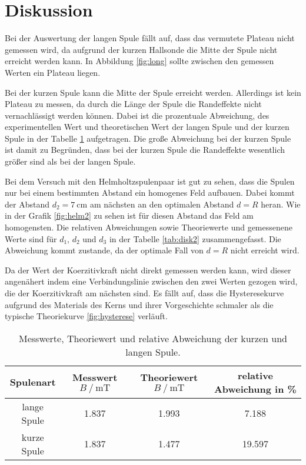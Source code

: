 \section{Diskussion}
\label{sec:Diskussion}

Bei der Auswertung der langen Spule fällt auf, dass das vermutete Plateau nicht gemessen wird, da aufgrund der kurzen Hallsonde die Mitte der Spule nicht erreicht werden kann.
In Abbildung \ref{fig:long} sollte zwischen den gemessen Werten ein Plateau liegen.

Bei der kurzen Spule kann die Mitte der Spule erreicht werden. 
Allerdings ist kein Plateau zu messen, da durch die Länge der Spule die Randeffekte nicht vernachlässigt werden können.
Dabei ist die prozentuale Abweichung, des experimentellen Wert und theoretischen Wert der langen Spule und der kurzen Spule in der Tabelle \ref{tab:disk1} aufgetragen.
Die große Abweichung bei der kurzen Spule ist damit zu Begründen, dass bei der kurzen Spule die Randeffekte wesentlich größer sind als bei der langen Spule.

Bei dem Versuch mit den Helmholtzspulenpaar ist gut zu sehen, dass die Spulen nur bei einem bestimmten Abstand ein homogenes Feld aufbauen.
Dabei kommt der Abstand $d_2=\SI{7}{\centi\meter}$ am nächsten an den optimalen Abstand $d=R$ heran. Wie in der Grafik \ref{fig:helm2} zu sehen ist für diesen Abstand das Feld am homogensten.
Die relativen Abweichungen sowie Theoriewerte und gemessenene Werte sind für $d_1$, $d_2$ und $d_3$ in der Tabelle \ref{tab:disk2} zusammengefasst.
Die Abweichung kommt zustande, da der optimale Fall von $d=R$ nicht erreicht wird.

Da der Wert der Koerzitivkraft nicht direkt gemessen werden kann, wird dieser angenähert indem eine Verbindungslinie zwischen den zwei Werten gezogen wird, die der Koerzitivkraft am nächsten sind.
Es fällt auf, dass die Hysteresekurve aufgrund des Materials des Kerns und ihrer Vorgeschichte schmaler als die typische Theoriekurve \ref{fig:hysterese} verläuft.

\begin{table}
\centering
\caption{Messwerte, Theoriewert und relative Abweichung der kurzen und langen Spule.}
\begin{tabular}{c|ccc}
    \toprule
    Spulenart &  Messwert $B\:/\: \si{\milli\tesla}$ & Theoriewert $B\:/\: \si{\milli\tesla}$ & relative Abweichung in \% \\
    \midrule
    lange Spule & 1.837 & 1.993 & 7.188\\
    kurze Spule & 1.837 & 1.477 & 19.597 \\
    \bottomrule
\end{tabular}
\label{tab:disk1}
\end{table}


